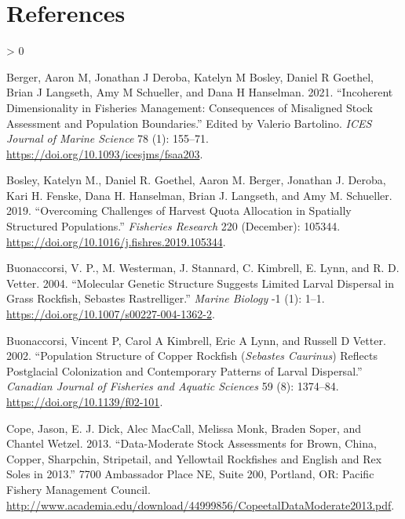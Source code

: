 \documentclass[11pt,
  english,
  a4paper,
]{article}
\newlength{\cslhangindent}
\newenvironment{CSLReferences}[2] %
 {%
  \setlength{\parindent}{0pt}
  \ifodd #1 \everypar{\setlength{\hangindent}{\cslhangindent}}\ignorespaces\fi
  \ifnum #2 > 0
  \setlength{\parskip}{#2\baselineskip}
  \fi
 }%
 {}
\begin{document}
\leavevmode\tagmcend\tagstructend\par

\clearpage


\hypertarget{references}{%
\section{References}\label{references}}

\leavevmode\tagmcend\tagstructend


\hypertarget{refs}{}
\begin{CSLReferences}{1}{0}
\leavevmode\hypertarget{ref-berger_incoherent_2021}{}%
Berger, Aaron M, Jonathan J Deroba, Katelyn M Bosley, Daniel R Goethel, Brian J Langseth, Amy M Schueller, and Dana H Hanselman. 2021. {``Incoherent Dimensionality in Fisheries Management: Consequences of Misaligned Stock Assessment and Population Boundaries.''} Edited by Valerio Bartolino. \emph{ICES Journal of Marine Science} 78 (1): 155--71. \url{https://doi.org/10.1093/icesjms/fsaa203}.

\leavevmode\hypertarget{ref-bosley_overcoming_2019}{}%
Bosley, Katelyn M., Daniel R. Goethel, Aaron M. Berger, Jonathan J. Deroba, Kari H. Fenske, Dana H. Hanselman, Brian J. Langseth, and Amy M. Schueller. 2019. {``Overcoming Challenges of Harvest Quota Allocation in Spatially Structured Populations.''} \emph{Fisheries Research} 220 (December): 105344. \url{https://doi.org/10.1016/j.fishres.2019.105344}.

\leavevmode\hypertarget{ref-buonaccorsi_molecular_2004}{}%
Buonaccorsi, V. P., M. Westerman, J. Stannard, C. Kimbrell, E. Lynn, and R. D. Vetter. 2004. {``Molecular Genetic Structure Suggests Limited Larval Dispersal in Grass Rockfish, {Sebastes} Rastrelliger.''} \emph{Marine Biology} -1 (1): 1--1. \url{https://doi.org/10.1007/s00227-004-1362-2}.

\leavevmode\hypertarget{ref-buonaccorsi_population_2002}{}%
Buonaccorsi, Vincent P, Carol A Kimbrell, Eric A Lynn, and Russell D Vetter. 2002. {``Population Structure of Copper Rockfish (\emph{{Sebastes} Caurinus}) Reflects Postglacial Colonization and Contemporary Patterns of Larval Dispersal.''} \emph{Canadian Journal of Fisheries and Aquatic Sciences} 59 (8): 1374--84. \url{https://doi.org/10.1139/f02-101}.

\leavevmode\hypertarget{ref-cope_data-moderate_2013}{}%
Cope, Jason, E. J. Dick, Alec MacCall, Melissa Monk, Braden Soper, and Chantel Wetzel. 2013. {``Data-Moderate Stock Assessments for Brown, {China}, Copper, Sharpchin, Stripetail, and Yellowtail Rockfishes and {English} and Rex Soles in 2013.''} 7700 Ambassador Place NE, Suite 200, Portland, OR: Pacific Fishery Management Council. \url{http://www.academia.edu/download/44999856/CopeetalDataModerate2013.pdf}.


\end{CSLReferences}
\end{document}

